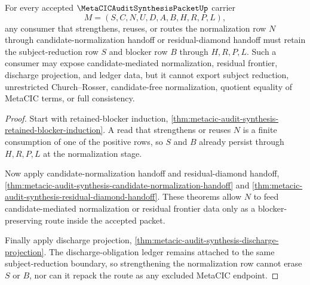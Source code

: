 \begin{theorem}
\label{thm:metacic-audit-synthesis-normalization-blocker-monotonicity}
For every accepted $\MetaCICAuditSynthesisPacketUp$ carrier
$$
M=(S,C,N,U,D,A,B,H,R,P,L),
$$
any consumer that strengthens, reuses, or routes the normalization row $N$ through candidate-normalization handoff or residual-diamond handoff must retain the subject-reduction row $S$ and blocker row $B$ through $H,R,P,L$. Such a consumer may expose candidate-mediated normalization, residual frontier, discharge projection, and ledger data, but it cannot export subject reduction, unrestricted Church--Rosser, candidate-free normalization, quotient equality of MetaCIC terms, or full consistency.
\end{theorem}
\begin{proof}
Start with retained-blocker induction, \autoref{thm:metacic-audit-synthesis-retained-blocker-induction}. A read that strengthens or reuses $N$ is a finite consumption of one of the positive rows, so $S$ and $B$ already persist through $H,R,P,L$ at the normalization stage.

Now apply candidate-normalization handoff and residual-diamond handoff, \autoref{thm:metacic-audit-synthesis-candidate-normalization-handoff} and \autoref{thm:metacic-audit-synthesis-residual-diamond-handoff}. These theorems allow $N$ to feed candidate-mediated normalization or residual frontier data only as a blocker-preserving route inside the accepted packet.

Finally apply discharge projection, \autoref{thm:metacic-audit-synthesis-discharge-projection}. The discharge-obligation ledger remains attached to the same subject-reduction boundary, so strengthening the normalization row cannot erase $S$ or $B$, nor can it repack the route as any excluded MetaCIC endpoint.
\end{proof}

